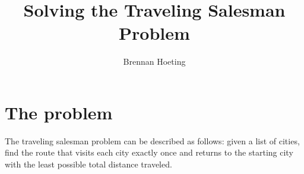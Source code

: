 \documentclass{article}
\begin{document}
\title{Solving the Traveling Salesman Problem}
\author{Brennan Hoeting}
\date{}
\maketitle 

\section{The problem}
The traveling salesman problem can be described as follows:
given a list of cities, find the route that visits each city
exactly once and returns to the starting city with the least possible total
distance traveled.  
  
\end{document}
